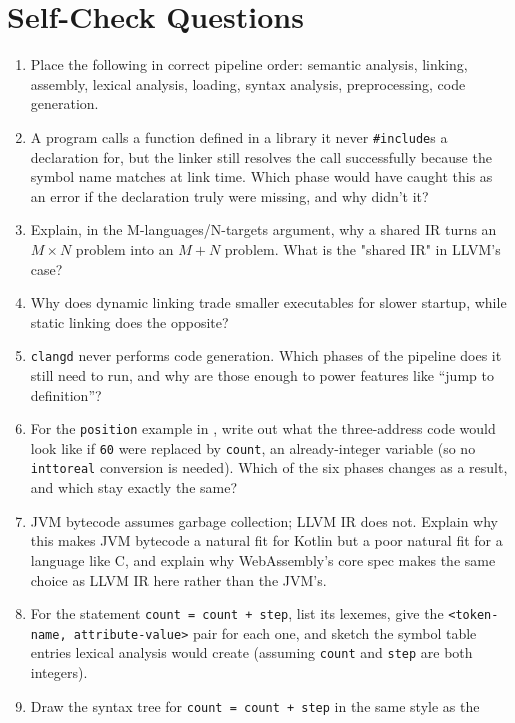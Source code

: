 \documentclass[full-course-notes.tex]{subfiles}
\begin{document}
\section{Self-Check Questions}
\label{sec:l2-selfcheck}

\begin{enrichment}
\begin{enumerate}
  \item Place the following in correct pipeline order: semantic analysis, linking, assembly,
  lexical analysis, loading, syntax analysis, preprocessing, code generation.
  \item A program calls a function defined in a library it never \texttt{\#include}s a
  declaration for, but the linker still resolves the call successfully because the symbol name
  matches at link time. Which phase would have caught this as an error if the declaration truly
  were missing, and why didn't it?
  \item Explain, in the M-languages/N-targets argument, why a shared IR turns an
  $M \times N$ problem into an $M + N$ problem. What is the "shared IR" in LLVM's case?
  \item Why does dynamic linking trade smaller executables for slower startup, while static
  linking does the opposite?
  \item \texttt{clangd} never performs code generation. Which phases of the pipeline does it
  still need to run, and why are those enough to power features like ``jump to definition''?
  \item For the \texttt{position} example in , write out what the three-address code would
  look like if \texttt{60} were replaced by \texttt{count}, an already-integer variable (so no
  \texttt{inttoreal} conversion is needed). Which of the six phases changes as a result, and
  which stay exactly the same?
  \item JVM bytecode assumes garbage collection; LLVM IR does not. Explain why this makes JVM
  bytecode a natural fit for Kotlin but a poor natural fit for a language like C, and explain why
  WebAssembly's core spec makes the same choice as LLVM IR here rather than the JVM's.
  \item For the statement \texttt{count = count + step}, list its lexemes, give the
  \texttt{<token-name, attribute-value>} pair for each one, and sketch the symbol table entries
  lexical analysis would create (assuming \texttt{count} and \texttt{step} are both integers).
  \item Draw the syntax tree for \texttt{count = count + step} in the same style as the

\end{enumerate}
\end{enrichment}
\end{document}
